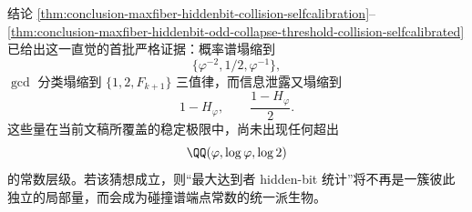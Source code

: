 \noindent
结论 \ref{thm:conclusion-maxfiber-hiddenbit-collision-selfcalibration}--\ref{thm:conclusion-maxfiber-hiddenbit-odd-collapse-threshold-collision-selfcalibrated} 已给出这一直觉的首批严格证据：概率谱塌缩到
\[
\{\varphi^{-2},1/2,\varphi^{-1}\},
\]
\(\gcd\) 分类塌缩到 \(\{1,2,F_{k+1}\}\) 三值律，而信息泄露又塌缩到
\[
1-H_\varphi,\qquad \frac{1-H_\varphi}{2}.
\]
这些量在当前文稿所覆盖的稳定极限中，尚未出现任何超出
\[
\QQ(\varphi,\log\varphi,\log 2)
\]
的常数层级。若该猜想成立，则“最大达到者 hidden-bit 统计”将不再是一簇彼此独立的局部量，而会成为碰撞谱端点常数的统一派生物。

